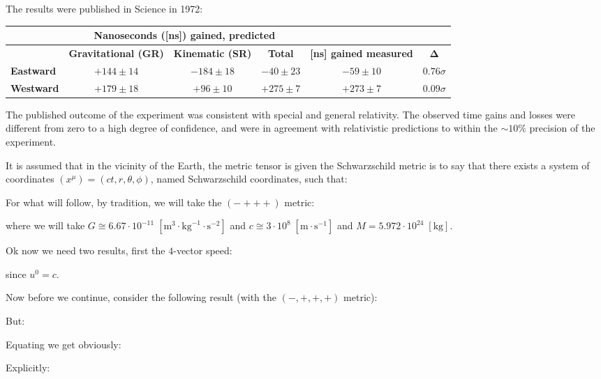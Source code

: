 	The results were published in Science in 1972:
	\begin{table}[H]
		\centering
		\begin{tabular}{|l|c|c|c|l|l|}
		\hline
		\rowcolor[HTML]{9B9B9B} 
		 & \multicolumn{3}{c|}{\cellcolor[HTML]{9B9B9B}\textbf{Nanoseconds ([ns]) gained, predicted}} &  &  \\ \hline
		\rowcolor[HTML]{9B9B9B} 
		 & \textbf{Gravitational (GR)} & \multicolumn{1}{l|}{\cellcolor[HTML]{9B9B9B}\textbf{Kinematic (SR)}} & \textbf{Total} & \parbox{2cm}{\textbf{[ns] gained measured}} &  \\ \hline
		\textbf{Eastward} & $+144 \pm 14$ & $-184 \pm 18$ & $-40 \pm 23$ &  & $0.76 \sigma$ \\ \hline
		\textbf{Westward} & $+179\pm 18$ & $+96 \pm 10$ & $+275 \pm 7$ &  & $0.09 \sigma$ \\ \hline
		\end{tabular}
	\end{table}
	The published outcome of the experiment was consistent with special and general relativity. The observed time gains and losses were different from zero to a high degree of confidence, and were in agreement with relativistic predictions to within the $\sim 10\%$ precision of the experiment.	
	
	It is assumed that in the vicinity of the Earth, the metric tensor is given the Schwarzschild metric is to say that there exists a system of coordinates $(x^\mu)=(ct,r,\theta,\phi)$, named Schwarzschild coordinates, such that:
	
	For what will follow, by tradition, we will take the $(- + + +)$ metric:
	
	where we will take $G \cong 6.67\cdot 10^{-11}\;[\text{m}^3\cdot \text{kg}^{-1}\cdot \text{s}^{-2}]$ and $c \cong 3 \cdot 10^8\;[\text{m}\cdot \text{s}^{-1}]$ and $M = 5.972\cdot 10^{24}\; [\text{kg}]$.
	
	Ok now we need two results, first the $4$-vector speed:
	
	since $u^0=c$.
	
	Now before we continue, consider the following result (with the $(-, +, +, +)$ metric):
	
	But:
	
	Equating we get obviously:
	
	Explicitly:
	
